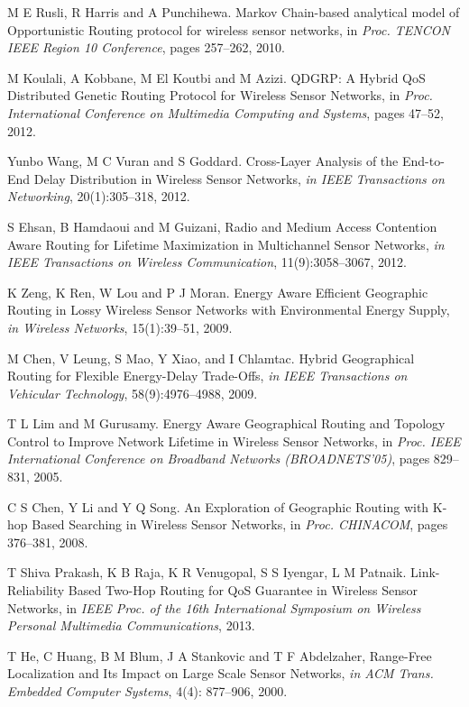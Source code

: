 \documentclass[fleqn,twoside]{article}
\begin{document}
\begin{thebibliography}{37}
{M E Rusli, R Harris and A Punchihewa}. {Markov Chain-based analytical
  model of Opportunistic Routing protocol for wireless sensor networks}, in
  \emph{Proc. TENCON IEEE Region 10 Conference},  pages 257--262, 2010.

{M Koulali, A Kobbane, M El Koutbi and M Azizi}. {QDGRP: A Hybrid QoS
  Distributed Genetic Routing Protocol for Wireless Sensor Networks}, in
  \emph{Proc. International Conference on Multimedia Computing and Systems},
   pages 47--52, 2012.

{Yunbo Wang, M C Vuran and S Goddard}. {Cross-Layer Analysis of the
  End-to-End Delay Distribution in Wireless Sensor Networks}, \emph{in IEEE
  Transactions on Networking}, 20(1):305--318, 2012.

{S Ehsan, B Hamdaoui and M Guizani}, {Radio and Medium Access Contention
  Aware Routing for Lifetime Maximization in Multichannel Sensor Networks},
  \emph{in IEEE Transactions on Wireless Communication}, 11(9):3058--3067, 2012.

{K Zeng, K Ren, W Lou and P J Moran}. {Energy Aware Efficient
  Geographic Routing in Lossy Wireless Sensor Networks with Environmental
  Energy Supply}, \emph{in Wireless Networks}, 15(1):39--51, 2009.

{M Chen, V Leung, S Mao, Y Xiao, and I Chlamtac}. {Hybrid Geographical
  Routing for Flexible Energy-Delay Trade-Offs}, \emph{in IEEE Transactions
  on Vehicular Technology}, 58(9):4976--4988, 2009.

{T L Lim and M Gurusamy}. {Energy Aware Geographical Routing and Topology
  Control to Improve Network Lifetime in Wireless Sensor Networks}, in
  \emph{Proc. IEEE International Conference on Broadband Networks
  (BROADNETS’05)},  pages 829--831, 2005.

{C S Chen, Y Li and Y Q Song}. {An Exploration of Geographic Routing
  with K-hop Based Searching in Wireless Sensor Networks}, in \emph{Proc.
  CHINACOM},  pages 376--381, 2008.

{T Shiva Prakash, K B Raja, K R Venugopal, S S Iyengar, L M
  Patnaik}. {Link-Reliability Based Two-Hop Routing for QoS Guarantee in
  Wireless Sensor Networks}, in \emph{IEEE Proc. of the 16th International
  Symposium on Wireless Personal Multimedia Communications}, 2013.

{T He, C Huang, B M Blum, J A Stankovic and T F Abdelzaher},
  {Range-Free Localization and Its Impact on Large Scale Sensor Networks},
  \emph{in ACM Trans. Embedded Computer Systems}, 4(4): 877--906, 2000.


\end{thebibliography}
\end{document}
